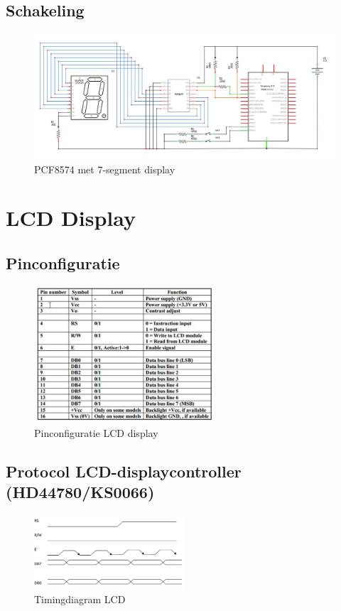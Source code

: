 \documentclass{article}
\begin{document}
\subsection{Schakeling}

\begin{figure}[H]
    \centering
    \includegraphics[width=\textwidth]{pcf-schakeling.png}
    \caption{PCF8574 met 7-segment display}
\end{figure}


\section{LCD Display}

\subsection{Pinconfiguratie}
\begin{figure}[H]
    \centering
    \includegraphics[width=0.6\textwidth]{lcd-pin.png}
    \caption{Pinconfiguratie LCD display}
\end{figure}

\subsection{Protocol LCD-displaycontroller (HD44780/KS0066)}
\begin{figure}[H]
    \centering
    \includegraphics[width=0.5\textwidth]{lcd-timing.png}
    \caption{Timingdiagram LCD}
\end{figure}
\end{document}
